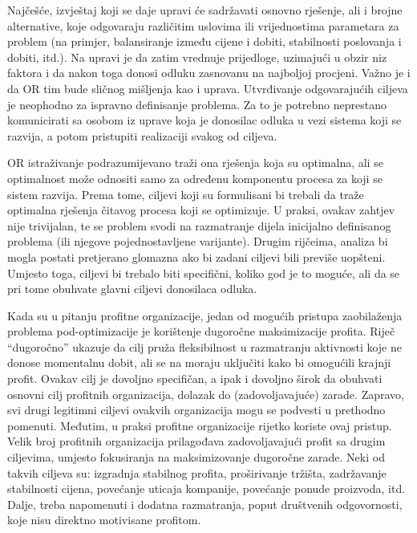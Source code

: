 \documentclass[a4paper, utf8, 11pt, colorlinks]{book}
\begin{document}
Najčešće, izvještaj koji se daje upravi će sadržavati osnovno rješenje, ali i brojne alternative, koje odgovaraju različitim uslovima ili  vrijednostima parametara za problem  (na primjer, balansiranje između cijene i dobiti, stabilnosti poslovanja i dobiti, itd.). Na upravi je da zatim vrednuje prijedloge, uzimajući u obzir  niz faktora i da nakon toga donosi odluku zasnovanu na najboljoj procjeni. Važno je i da OR tim bude sličnog mišljenja kao i uprava. Utvrđivanje odgovarajućih ciljeva je  neophodno za ispravno definisanje problema.  Za to je potrebno neprestano komunicirati sa osobom iz uprave koja je donosilac odluka u vezi sistema koji se razvija, a potom pristupiti  realizaciji svakog od ciljeva.

OR istraživanje podrazumijevano traži ona rješenja koja su optimalna, ali se optimalnost može odnositi samo za određenu komponentu procesa za koji se sistem razvija. Prema tome, ciljevi koji su formulisani bi trebali da traže optimalna rješenja čitavog procesa koji se optimizuje.  U praksi, ovakav zahtjev nije trivijalan, te se problem svodi na razmatranje dijela inicijalno definisanog problema (ili njegove pojednostavljene varijante). Drugim rijčeima, analiza bi mogla postati pretjerano glomazna ako bi zadani ciljevi bili previše uopšteni. Umjesto toga, ciljevi bi trebalo biti specifični, koliko god je to moguće, ali da se pri tome obuhvate glavni ciljevi donosilaca odluka. 

Kada su u pitanju profitne organizacije, jedan od mogućih pristupa zaobilaženja problema pod-optimizacije je korištenje dugoročne maksimizacije profita. Riječ ``dugoročno'' ukazuje da cilj pruža fleksibilnost u razmatranju aktivnosti koje ne donose momentalnu dobit, ali se na moraju uključiti kako bi omogućili krajnji profit. Ovakav cilj je dovoljno specifičan, a ipak i dovoljno širok da obuhvati osnovni cilj profitnih organizacija, dolazak do (zadovoljavajuće) zarade. Zapravo, svi drugi legitimni ciljevi ovakvih organizacija mogu se podvesti u prethodno pomenuti. Međutim, u praksi profitne organizacije rijetko koriste ovaj pristup. Velik broj profitnih organizacija prilagođava zadovoljavajući profit sa drugim ciljevima, umjesto fokusiranja na maksimizovanje dugoročne zarade. Neki od takvih ciljeva su: izgradnja stabilnog profita, proširivanje tržišta, zadržavanje stabilnosti cijena, povećanje uticaja kompanije, povećanje ponude proizvoda, itd. 
Dalje, treba napomenuti i dodatna razmatranja, poput društvenih odgovornosti, koje nisu direktno motivisane profitom.  
\end{document}
